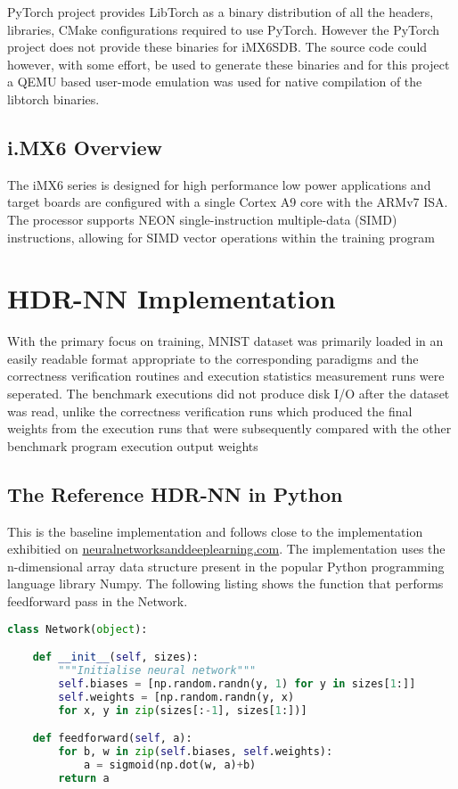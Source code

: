 PyTorch project provides LibTorch as a binary distribution of all the headers, libraries, CMake configurations required to use PyTorch. However the PyTorch project does not provide these binaries for iMX6SDB. The source code could however, with some effort, be used to generate these binaries and for this project a QEMU based user-mode emulation was used for native compilation of the libtorch binaries.

\subsection[ECU / iMX6 Evaluation Board Overview]{i.MX6 Overview}

The iMX6 series is designed for high performance low power applications and target boards are configured with a single Cortex A9 core with the ARMv7 ISA. The processor supports NEON single-instruction multiple-data (SIMD) instructions, allowing for SIMD vector operations within the training program

\section{HDR-NN Implementation}

With the primary focus on training, MNIST dataset was primarily loaded in an easily readable format appropriate to the corresponding paradigms and the correctness verification routines and execution statistics measurement runs were seperated. The benchmark executions did not produce disk I/O after the dataset was read, unlike the correctness verification runs which produced the final weights from the execution runs that were subsequently compared with the other benchmark program execution output weights

\subsection{The Reference HDR-NN in Python}

This is the baseline implementation and follows close to the implementation exhibitied on \href{http://neuralnetworksanddeeplearning.com}{neuralnetworksanddeeplearning.com}. The implementation uses the n-dimensional array data structure present in the popular Python programming language library Numpy. The following listing shows the function that performs feedforward pass in the Network.

\begin{lstlisting}[language=Python]
	class Network(object):

	def __init__(self, sizes):
		"""Initialise neural network"""
		self.biases = [np.random.randn(y, 1) for y in sizes[1:]]
		self.weights = [np.random.randn(y, x)
		for x, y in zip(sizes[:-1], sizes[1:])]

	def feedforward(self, a):
		for b, w in zip(self.biases, self.weights):
			a = sigmoid(np.dot(w, a)+b)
		return a
\end{lstlisting}

